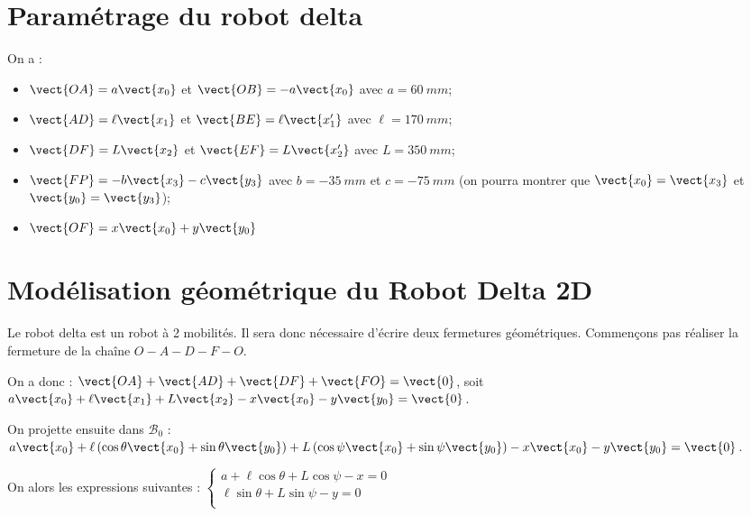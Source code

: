 \documentclass[10pt,fleqn]{article} %
\begin{document}
\graphicspath{{../../../style/png/}{images/}}






\section{Paramétrage du robot delta}

On a  :
\begin{itemize}
\item $\vect{OA} = a\vect{x_0}$ et $\vect{OB} =- a\vect{x_0}$  avec $a =\SI{60}{mm}$;
\item $\vect{AD} = \ell\vect{x_1}$ et $\vect{BE} = \ell\vect{x_1'}$ avec $\ell =\SI{170}{mm}$;
\item $\vect{DF} =  L\vect{x_2}$ et $\vect{EF} = L\vect{x_2'}$ avec $L=\SI{350}{mm}$;
\item $\vect{FP}=-b\vect{x_3}-c\vect{y_3}$ avec $b=-\SI{35}{mm}$ et $c=-\SI{75}{mm}$ 
(on pourra montrer que $\vect{x_0}=\vect{x_3}$ et $\vect{y_0}=\vect{y_3}$);
\item $\vect{OF} = x\vect{x_0} +y\vect{y_0} $
\end{itemize}

\section{Modélisation géométrique du Robot Delta 2D}

Le robot delta est un robot à 2 mobilités. Il sera donc nécessaire d'écrire deux fermetures géométriques. 
Commençons pas réaliser la fermeture de la chaîne $O - A - D - F - O$. 

On a donc : 
$\vect{OA}+\vect{AD}+\vect{DF}+\vect{FO} = \vect{0}$, soit 
$a\vect{x_0}+ \ell\vect{x_1}+L\vect{x_2} -x\vect{x_0} -y\vect{y_0} = \vect{0}$.

On projette ensuite dans $\mathcal{B}_{0}$ :
$a\vect{x_0}+ \ell \left( \cos\theta \vect{x_0} + \sin\theta \vect{y_0} \right)+L\left( \cos\psi \vect{x_0} + \sin\psi\vect{y_0} \right) -x\vect{x_0} -y\vect{y_0} = \vect{0}$. 

On alors les expressions suivantes :
$
\left\{
\begin{array}{l}
a+ \ell  \cos\theta +L \cos\psi   -x  = 0 \\
\ell   \sin\theta +L\sin\psi  -y = 0 \\
\end{array}
\right.
$
\end{document}
